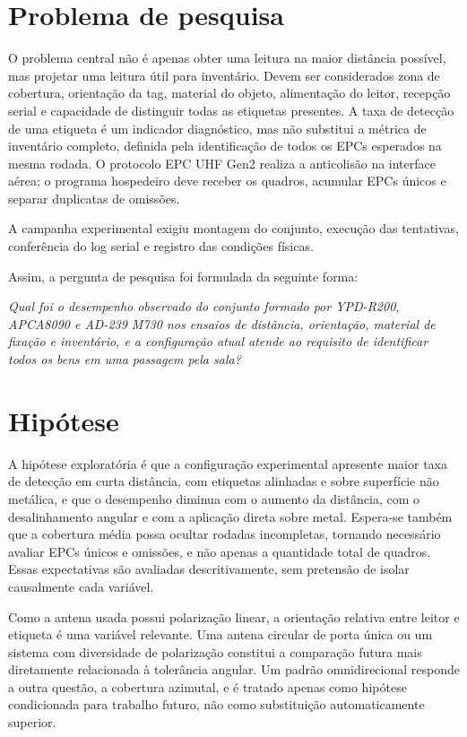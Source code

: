 \section{Problema de pesquisa}

O problema central não é apenas obter uma leitura na maior distância possível, mas projetar uma leitura útil para inventário. Devem ser considerados zona de cobertura, orientação da tag, material do objeto, alimentação do leitor, recepção serial e capacidade de distinguir todas as etiquetas presentes. A taxa de detecção de uma etiqueta é um indicador diagnóstico, mas não substitui a métrica de inventário completo, definida pela identificação de todos os EPCs esperados na mesma rodada. O protocolo EPC UHF Gen2 realiza a anticolisão na interface aérea; o programa hospedeiro deve receber os quadros, acumular EPCs únicos e separar duplicatas de omissões.

A campanha experimental exigiu montagem do conjunto, execução das tentativas, conferência do log serial e registro das condições físicas.

Assim, a pergunta de pesquisa foi formulada da seguinte forma:

\begin{center}
    \begin{minipage}{0.82\textwidth}
        \itshape Qual foi o desempenho observado do conjunto formado por YPD-R200, APCA8090 e AD-239 M730 nos ensaios de distância, orientação, material de fixação e inventário, e a configuração atual atende ao requisito de identificar todos os bens em uma passagem pela sala?
    \end{minipage}
\end{center}

\section{Hipótese}

A hipótese exploratória é que a configuração experimental apresente maior taxa de detecção em curta distância, com etiquetas alinhadas e sobre superfície não metálica, e que o desempenho diminua com o aumento da distância, com o desalinhamento angular e com a aplicação direta sobre metal. Espera-se também que a cobertura média possa ocultar rodadas incompletas, tornando necessário avaliar EPCs únicos e omissões, e não apenas a quantidade total de quadros. Essas expectativas são avaliadas descritivamente, sem pretensão de isolar causalmente cada variável.

Como a antena usada possui polarização linear, a orientação relativa entre leitor e etiqueta é uma variável relevante. Uma antena circular de porta única ou um sistema com diversidade de polarização constitui a comparação futura mais diretamente relacionada à tolerância angular. Um padrão omnidirecional responde a outra questão, a cobertura azimutal, e é tratado apenas como hipótese condicionada para trabalho futuro, não como substituição automaticamente superior.


